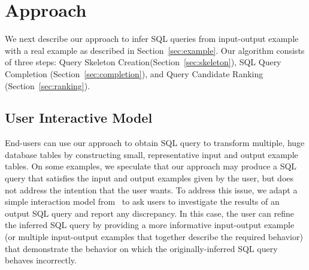 
\section{Approach}
\label{sec:approach}



We next describe our approach to infer SQL queries from 
input-output example with a real example as described
in Section~\ref{sec:example}. Our algorithm consists of three steps:
Query Skeleton Creation(Section~\ref{sec:skeleton}),
SQL Query Completion (Section~\ref{sec:completion}), and
Query Candidate Ranking (Section~\ref{sec:ranking}).








\subsection{User Interactive Model}
\label{sec:uim}

End-users can use our approach to obtain SQL query to transform
multiple, huge database tables by constructing small, representative
input and output example tables. On some examples, we speculate
that our approach
may produce a SQL query that satisfies the input and output examples
given by the user, but does not address the intention
that the user wants. To address this issue, we adapt a simple
interaction model from~\cite{Harris:2011} to ask users to investigate the results of
an output SQL query and report any discrepancy. In this case,
the user can refine the inferred SQL query by providing a more
informative input-output example (or multiple input-output examples
that together describe the required behavior) that demonstrate the behavior on
which the originally-inferred SQL query behaves incorrectly.

